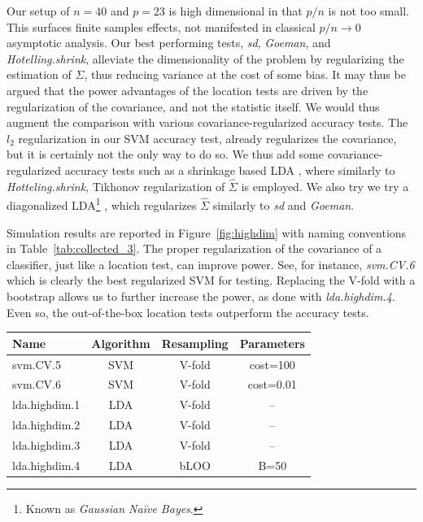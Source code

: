 \documentclass[12pt,a4paper]{article}
\begin{document}
Our setup of $n=40$ and $p=23$ is high dimensional in that $p/n$ is not too small. 
This surfaces finite samples effects, not manifested in classical $p/n \to 0$ asymptotic analysis.
Our best performing tests, \emph{sd}, \emph{Goeman}, and \emph{Hotelling.shrink}, alleviate the dimensionality of the problem by regularizing the estimation of $\Sigma$, thus reducing variance at the cost of some bias. 
It may thus be argued that the power advantages of the location tests are driven by the regularization of the covariance, and not the statistic itself.
We would thus augment the comparison with various covariance-regularized accuracy tests.
The $l_2$ regularization in our SVM accuracy test, already regularizes the covariance, but it is certainly not the only way to do so. 
We thus add some covariance-regularized accuracy tests such as a shrinkage based LDA \citep{pang_shrinkage-based_2009,ramey_high-dimensional_2016}, where similarly to \emph{Hotteling.shrink}, Tikhonov regularization of $\hat \Sigma$ is employed. 
We also try we try a diagonalized LDA\footnote{Known as \emph{Gaussian Na\"ive Bayes}.} \citep{dudoit_comparison_2002}, which regularizes $\hat{\Sigma}$ similarly to \emph{sd} and \emph{Goeman}.

Simulation results are reported in Figure~\ref{fig:highdim} with naming conventions in Table~\ref{tab:collected_3}.
The proper regularization of the covariance of a classifier, just like a location test, can improve power. 
See, for instance, \emph{svm.CV.6} which is clearly the best regularized SVM for testing. 
Replacing the V-fold  with a bootstrap allows us to further increase the power, as done with \emph{lda.highdim.4}.
Even so, the out-of-the-box location tests outperform the accuracy tests.

\bigskip

\begin{tcolorbox}
	\centering
	\begin{tabular}{l|c|c|c}
		Name & Algorithm & Resampling &  Parameters\\ 
		\hline
		\hline
		svm.CV.5 & SVM & V-fold & cost=100 \\ 
		svm.CV.6 & SVM & V-fold & cost=0.01\\ 
		lda.highdim.1 & LDA & V-fold & -- \\ 
		lda.highdim.2 & LDA & V-fold & -- \\ 
		lda.highdim.3 & LDA & V-fold & -- \\ 
		lda.highdim.4 & LDA & bLOO 	 & B=50 \\ 
	\end{tabular} 
	\captionsetup{type=table}
	\caption{
		The same as Table~\ref{tab:collected} for regularized (high dimensional) predictors. 
		\emph{svm.CV.5} and \emph{svm.CV.6} are $l_2$ regularized SVM, with varying regularization penalty.
		\emph{lda.highdim.1} is the Diagonal Linear Discriminant Analysis of \cite{dudoit_comparison_2002}.
		\emph{lda.highdim.2} is the High-Dimensional Regularized Discriminant Analysis of \cite{ramey_high-dimensional_2016}.
		\emph{lda.highdim.3} is the Shrinkage-based Diagonal Linear Discriminant Analysis of \cite{pang_shrinkage-based_2009}.
		\emph{lda.highdim.4} is the same with bLOO.
	} 
	\label{tab:collected_3}
\end{tcolorbox}
\end{document}
